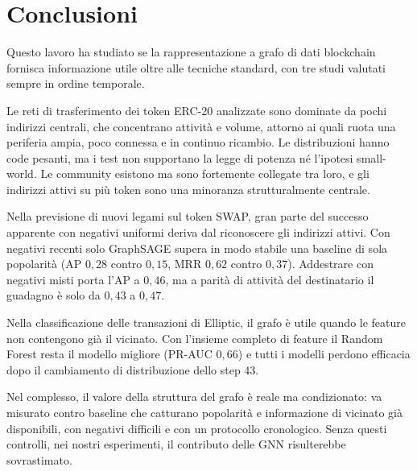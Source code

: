 \documentclass[11pt]{article}
\begin{document}
\newpage
\section{Conclusioni}\label{sec:conclusioni}

Questo lavoro ha studiato se la rappresentazione a grafo di dati blockchain
fornisca informazione utile oltre alle tecniche standard, con tre studi
valutati sempre in ordine temporale.

Le reti di trasferimento dei token ERC-20 analizzate sono dominate da pochi
indirizzi centrali, che concentrano attività e volume, attorno ai quali
ruota una periferia ampia, poco connessa e in continuo ricambio. Le
distribuzioni hanno code pesanti, ma i test non supportano la legge di
potenza né l'ipotesi small-world. Le community esistono ma sono fortemente
collegate tra loro, e gli indirizzi attivi su più token sono una minoranza
strutturalmente centrale.

Nella previsione di nuovi legami sul token SWAP, gran parte del successo
apparente con negativi uniformi deriva dal riconoscere gli indirizzi attivi.
Con negativi recenti solo GraphSAGE supera in modo stabile una baseline di
sola popolarità (AP $0{,}28$ contro $0{,}15$, MRR $0{,}62$ contro $0{,}37$).
Addestrare con negativi misti porta l'AP a $0{,}46$, ma a parità di
attività del destinatario il guadagno è solo da $0{,}43$ a $0{,}47$.

Nella classificazione delle transazioni di Elliptic, il grafo è utile
quando le feature non contengono già il vicinato. Con l'insieme completo di
feature il Random Forest resta il modello migliore (PR-AUC $0{,}66$) e tutti
i modelli perdono efficacia dopo il cambiamento di distribuzione dello step
43.

Nel complesso, il valore della struttura del grafo è reale ma condizionato:
va misurato contro baseline che catturano popolarità e informazione di
vicinato già disponibili, con negativi difficili e con un protocollo
cronologico. Senza questi controlli, nei nostri esperimenti, il contributo delle GNN
risulterebbe sovrastimato.

\newpage


\end{document}
